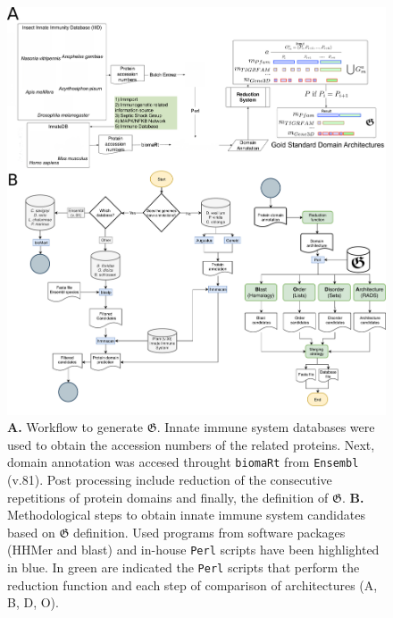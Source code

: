 \documentclass[11pt]{article}
\begin{document}
\begin{figure}[htb]
\begin{center}
\includegraphics[scale=0.15]{figures/completeALLWorkflow22}
\caption{\textbf{A.} Workflow to generate $\boldsymbol{\mathfrak{G}}$. Innate 
immune system databases were used to obtain the accession numbers of the 
related proteins. Next, domain annotation was accesed throught \texttt{biomaRt} 
from \texttt{Ensembl} (v.81). Post processing include reduction of the 
consecutive repetitions of protein domains and finally, the definition of 
$\boldsymbol{\mathfrak{G}}$. \textbf{B.} Methodological steps to obtain innate 
immune system candidates based on $\boldsymbol{\mathfrak{G}}$ definition. 
Used programs from software packages (HHMer and blast) and in-house 
\texttt{Perl} scripts have been highlighted in blue. In green are indicated the 
\texttt{Perl} scripts that perform the reduction function and each step of 
comparison of architectures (A, B, D, O).}  
\label{workflow_golden}
\end{center}
\end{figure}

\end{document}
